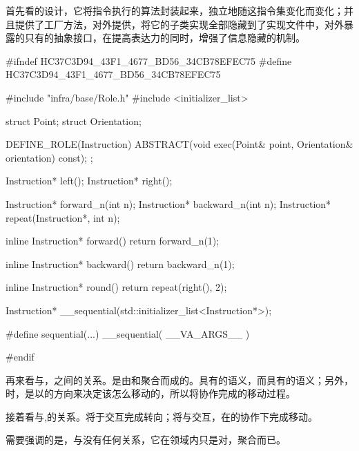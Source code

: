 \begin{content}

首先看的设计，它将指令执行的算法封装起来，独立地随这指令集变化而变化；并且提供了工厂方法，对外提供，将它的子类实现全部隐藏到了实现文件中，对外暴露的只有的抽象接口，在提高表达力的同时，增强了信息隐藏的机制。

\begin{leftbar}
\begin{c++}[caption={test/robot-cleaner/TestRobotCleaner.h}]
#ifndef HC37C3D94_43F1_4677_BD56_34CB78EFEC75
#define HC37C3D94_43F1_4677_BD56_34CB78EFEC75

#include "infra/base/Role.h"
#include <initializer_list>

struct Point;
struct Orientation;

DEFINE_ROLE(Instruction)
{
    ABSTRACT(void exec(Point& point, Orientation& orientation) const);
};

Instruction* left();
Instruction* right();

Instruction* forward_n(int n);
Instruction* backward_n(int n);
Instruction* repeat(Instruction*, int n);

inline Instruction* forward()
{ return forward_n(1);  }

inline Instruction* backward()
{ return backward_n(1); }

inline Instruction* round()
{ return repeat(right(), 2); }

Instruction* __sequential(std::initializer_list<Instruction*>);

#define sequential(...) __sequential({ __VA_ARGS__ })

#endif
\end{c++}
\end{leftbar}

再来看与，之间的关系。是由和聚合而成的。具有的语义，而具有的语义；另外，时，是以的方向来决定该怎么移动的，所以将协作完成的移动过程。

接着看与,的关系。将于交互完成转向；将与交互，在的协作下完成移动。

需要强调的是，与没有任何关系，它在领域内只是对，聚合而已。


\end{content}
